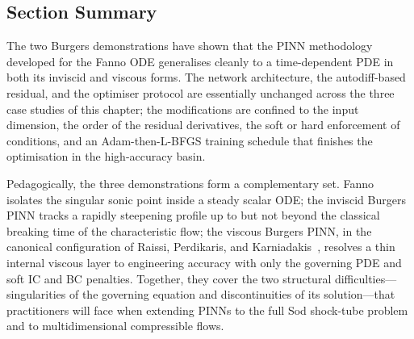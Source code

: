 \documentclass[11pt,a4paper]{report}
\begin{document}
\subsection{Section Summary}

The two Burgers demonstrations have shown that the PINN methodology developed for the Fanno ODE generalises cleanly to a time-dependent PDE in both its inviscid and viscous forms. The network architecture, the autodiff-based residual, and the optimiser protocol are essentially unchanged across the three case studies of this chapter; the modifications are confined to the input dimension, the order of the residual derivatives, the soft or hard enforcement of conditions, and an Adam-then-L-BFGS training schedule that finishes the optimisation in the high-accuracy basin.

Pedagogically, the three demonstrations form a complementary set. Fanno isolates the singular sonic point inside a steady scalar ODE; the inviscid Burgers PINN tracks a rapidly steepening profile up to but not beyond the classical breaking time of the characteristic flow; the viscous Burgers PINN, in the canonical configuration of Raissi, Perdikaris, and Karniadakis~\cite{Raissi2019PINN}, resolves a thin internal viscous layer to engineering accuracy with only the governing PDE and soft IC and BC penalties. Together, they cover the two structural difficulties---singularities of the governing equation and discontinuities of its solution---that practitioners will face when extending PINNs to the full Sod shock-tube problem and to multidimensional compressible flows.
\end{document}
